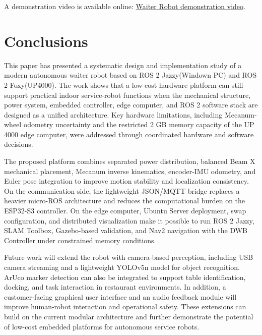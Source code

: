 \documentclass{llncs}
\begin{document}
A demonstration video is available online: \href{https://youtu.be/hw2yS5E_YpA?si=joVXpEF2XMeXMV-6}{Waiter Robot demonstration video}.

\section{Conclusions}
This paper has presented a systematic design and implementation study of a modern autonomous waiter robot based on ROS 2 Jazzy(Windown PC) and ROS 2 Foxy(UP4000). The work shows that a low-cost hardware platform can still support practical indoor service-robot functions when the mechanical structure, power system, embedded controller, edge computer, and ROS 2 software stack are designed as a unified architecture. Key hardware limitations, including Mecanum-wheel odometry uncertainty and the restricted 2 GB memory capacity of the UP 4000 edge computer, were addressed through coordinated hardware and software decisions.

The proposed platform combines separated power distribution, balanced Beam X mechanical placement, Mecanum inverse kinematics, encoder-IMU odometry, and Euler pose integration to improve motion stability and localization consistency. On the communication side, the lightweight JSON/MQTT bridge replaces a heavier micro-ROS architecture and reduces the computational burden on the ESP32-S3 controller. On the edge computer, Ubuntu Server deployment, swap configuration, and distributed visualization make it possible to run ROS 2 Jazzy, SLAM Toolbox, Gazebo-based validation, and Nav2 navigation with the DWB Controller under constrained memory conditions.

Future work will extend the robot with camera-based perception, including USB camera streaming and a lightweight YOLOv5n model for object recognition. ArUco marker detection can also be integrated to support table identification, docking, and task interaction in restaurant environments. In addition, a customer-facing graphical user interface and an audio feedback module will improve human-robot interaction and operational safety. These extensions can build on the current modular architecture and further demonstrate the potential of low-cost embedded platforms for autonomous service robots.
\end{document}
